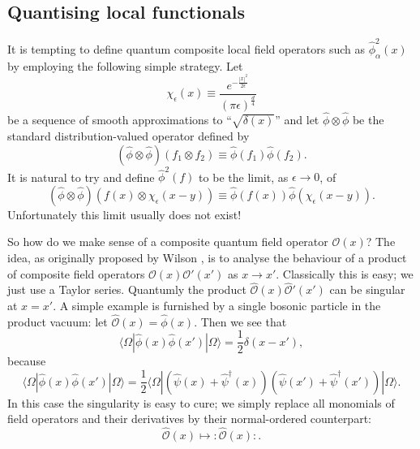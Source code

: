 \documentclass[prl,twocolumn,lengthcheck,superscriptaddress]{revtex4-1}
\theoremstyle{definition}
\theoremstyle{remark}
\begin{document}
\subsection{Quantising local functionals}
It is tempting to define quantum composite local field operators such as $\widehat{\phi}^2_\alpha(x)$ by employing the following simple strategy. Let 
\begin{equation}
	\chi_\epsilon(x) \equiv \frac{e^{-\frac{|x|^2}{2\epsilon}}}{(\pi\epsilon)^{\frac{d}{4}}}
\end{equation}
be a sequence of smooth approximations to ``$\sqrt{\delta(x)}$'' and let $\widehat{\phi}\otimes \widehat{\phi}$ be the standard distribution-valued operator defined by
\begin{equation}
	(\widehat{\phi}\otimes \widehat{\phi})(f_1\otimes f_2) \equiv \widehat{\phi}(f_1) \widehat{\phi}(f_2).
\end{equation}
It is natural to try and define $\widehat{\phi}^2(f)$ to be the limit, as $\epsilon\rightarrow 0$, of 
\begin{equation}
	(\widehat{\phi}\otimes \widehat{\phi})(f(x)\otimes \chi_\epsilon(x-y)) \equiv \widehat{\phi}(f(x)) \widehat{\phi}(\chi_\epsilon(x-y)).
\end{equation}
Unfortunately this limit usually does not exist!

So how do we make sense of a composite quantum field operator $\mathcal{O}(x)$? The idea, as originally proposed by Wilson \cite{wilson:1969a}, is to analyse the behaviour of a product of composite field operators $\mathcal{O}(x)\mathcal{O}'(x')$ as $x\rightarrow x'$. Classically this is easy; we just use a Taylor series. Quantumly the product $\widehat{\mathcal{O}}(x)\widehat{\mathcal{O}}'(x')$ can be singular at $x=x'$. A simple example is furnished by a single bosonic particle in the product vacuum: let $\widehat{\mathcal{O}}(x) = \widehat{\phi}(x)$. Then we see that
\begin{equation}
	\langle \Omega|\widehat{\phi}(x)\widehat{\phi}(x')|\Omega\rangle = \frac12\delta(x-x'),
\end{equation}
because 
\begin{equation}
	\langle \Omega|\widehat{\phi}(x)\widehat{\phi}(x')|\Omega\rangle = \frac12\langle \Omega|(\widehat{\psi}(x) + \widehat{\psi}^\dag(x))(\widehat{\psi}(x')+\widehat{\psi}^\dag(x'))|\Omega\rangle.
\end{equation}
In this case the singularity is easy to cure; we simply replace all monomials of field operators and their derivatives by their normal-ordered counterpart:
\begin{equation}
	\widehat{\mathcal{O}}(x) \mapsto {:}\widehat{\mathcal{O}}(x){:}.
\end{equation} 
\end{document}
